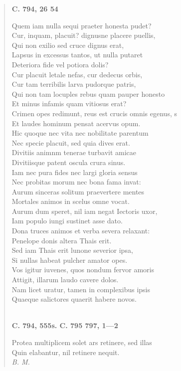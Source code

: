\documentclass[11pt, a4paper]{report}
\begin{document}
\begin{verse}
    \begin{center} \textbf{C. 794, 26 54} \end{center}Quem iam nulla sequi praeter honesta pudet? \\ Cur, inquam, placuit? dignusne placere puellis, \\ Qui non exilio sed cruce dignus erat, \\ Lapsus in excessus tantos, ut nulla putaret \\ Deteriora fide vel potiora dolis? \\ Cur placuit letale nefas, cur dedecus orbis, \\ Cur tam terribilis larva pudorque patris, \\ Qui non tam locuples rebus quam pauper honesto \\ Et minus infamis quam vitiosus erat? \\ Crimen opes redimunt, reus est crucis omnis egenus, s \\ Et laudes hominum pensat acervus opum. \\ Hic quoque nec vita nec nobilitate parentum \\ Nec specie placuit, sed quia dives erat. \\ Divitiis animnm tenerae turbavit amicae \\ Divitiisque patent oscula crura sinus. \\ Iam nec pura fides nec largi gloria sensus \\ Nec probitas morum nec bona fama invat: \\ Aurum sinceras solitum praevertere mentes \\ Mortales animos in scelus omne vocat. \\ Aurum dum speret, nil iam negat Iectoris uxor, \\ Iam populo iungi sustinet asse dato. \\ Dona truces animos et verba severa relaxant: \\ Penelope donis altera Thais erit. \\ Sed iam Thais erit lunone severior ipsa, \\ Si nullas habeat pulcher amator opes. \\ Vos igitur iuvenes, quos nondum fervor amoris \\ Attigit, illarum laudo cavere dolos. \\ Nam licet uratur, tamen in complexibus ipsis \\ Quaeque salictores quaerit habere novos. \\ 
        ﻿\pagebreak 
    \begin{center} \textbf{C. 794, 555s. C. 795 797, 1—2} \end{center} \marginpar{[273]} Protea multiplicem solet ars retinere, sed illas \\ Quin elabantur, nil retinere nequit. \\ \textit{B. M.} \\ 
      \end{verse}
  
\end{document}
